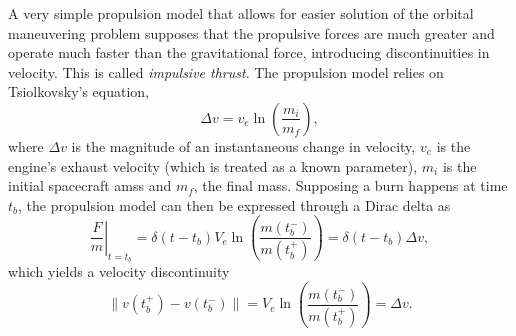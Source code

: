 
A very simple propulsion model that allows for easier solution of the orbital maneuvering problem supposes that the propulsive forces are much greater and operate much faster than the gravitational force, introducing discontinuities in velocity. This is called \textit{impulsive thrust}. The propulsion model relies on Tsiolkovsky's equation, 
\begin{equation}
    \Delta v = v_e \ln{\left(\frac{m_i}{m_f}\right)},
\end{equation}
where \(\Delta v\) is the magnitude of an instantaneous change in velocity, \(v_e\) is the engine's exhaust velocity (which is treated as a known parameter), \(m_i\) is the initial spacecraft amss and \(m_f\), the final mass. Supposing a burn happens at time \(t_b\), the propulsion model can then be expressed through a Dirac delta as
\begin{equation}
    \left.\frac{F}{m}\right\vert_{t = t_b} = \delta(t - t_b) V_e \ln{\left(\frac{m(t_b^-)}{m(t_b^+)} \right)} = \delta(t - t_b) \Delta v,
\end{equation}
which yields a velocity discontinuity
\begin{equation}
    \lVert v(t_b^+) - v(t_b^-) \rVert = V_e \ln{\left(\frac{m(t_b^-)}{m(t_b^+)}\right)} = \Delta v.
\end{equation}

